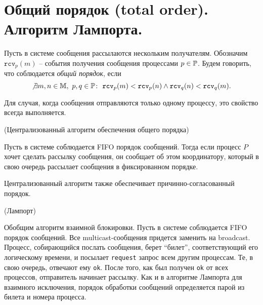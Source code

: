 \section{Общий порядок (total order). Алгоритм Лампорта.}

\begin{definition}
    Пусть в системе сообщения рассылаются нескольким получателям.
    Обозначим $\texttt{rcv}_p(m)$ -- события получения сообщения процессами
    $p \in \mathbb{P}$. Будем говорить, что соблюдается \textit{общий порядок},
    если
    \[
        \not\exists m,n \in \mathbb{M},~ p,q \in \mathbb{P}\colon~
        \texttt{rcv}_p(m) < \texttt{rcv}_p(n) \wedge
        \texttt{rcv}_q(n) < \texttt{rcv}_q(m)
    .\]
\end{definition}

\begin{remark}
    Для случая, когда сообщения отправляются только одному процессу, это
    свойство всегда выполняется.
\end{remark}

\begin{algorithm}(Централизованный алгоритм обеспечения общего порядка)

    Пусть в системе соблюдается FIFO порядок сообщений. Тогда если процесс
    $P$ хочет сделать рассылку сообщения, он сообщает об этом координатору,
    который в свою очередь рассылает сообщения в фиксированном порядке.
\end{algorithm}

\begin{remark}
    Централизованный алгоритм также обеспечивает причинно-согласованный порядок.
\end{remark}

\begin{algorithm}(Лампорт)
    
    Обобщим алгоритм взаимной блокировки. Пусть в системе соблюдается FIFO 
    порядок сообщений. Все multicast-сообщения придется заменить на broadcast.
    Процесс, собирающийся послать сообщения, берет ``билет'', соответствующий
    его логическому времени, и посылает \texttt{request} запрос всем другим
    процессам. Те, в свою очередь, отвечают ему \texttt{ok}. После того, как
    был получен \texttt{ok} от всех процессов, отправитель начинает рассылку.
    Как и в алгоритме Лампорта для взаимного исключения, порядок обработки сообщений
    определяется парой из билета и номера процесса.
\end{algorithm}


